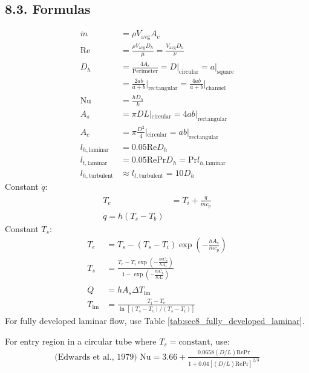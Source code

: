 \documentclass[10pt]{article}
\begin{document}
\begin{multicols*}{2}
\subsection*{8.3. Formulas}
\vspace{-0.4cm}
\begin{align*}
    \dot{m} &= \rho V_{\text{avg}} A_c \\
    \text{Re} &= \frac{\rho V_{\text{avg}} D_h}{\mu}  = \frac{V_{\text{avg}} D_h}{\nu} \\
    D_h &= \frac{4 A_c}{\text{Perimeter}} = D\rvert_{\text{circular}} = a\rvert_{\text{square}}   \\
    &= \frac{2ab}{a + b} \bigg\rvert_{\text{rectangular}} = \frac{4ab}{a+b}\bigg\rvert_{\text{channel}} \\
    \text{Nu} &= \frac{hD_h}{k} \\ 
    A_s &= \pi D L|_{\text{circular}} = 4ab|_{\text{rectangular}} \\
    A_c &= \pi \frac{D^2}{4}|_{\text{circular}} = ab|_{\text{rectangular}} \\
    l_{h, \text{laminar}} &= 0.05 \text{Re} D_h \\
    l_{t, \text{laminar}} &= 0.05 \text{Re} \text{Pr} D_h = \text{Pr} l_{h, \text{laminar}} \\
    l_{h, \text{turbulent}} &\approx l_{t, \text{turbulent}} = 10D_h 
\end{align*}
\vspace{-0.5cm}
Constant $\dot{q}$:
\begin{align*}
    T_e &= T_i + \frac{\dot{q}}{\dot{m} c_p} \\ 
    \dot{q} = h(T_s-T_b)
\end{align*}
Constant $T_s$:
\vspace{-0.5cm}
\begin{align*}
    T_e &= T_s - (T_s - T_i) \exp\left(-\frac{h A_s}{\dot{m} c_p}\right) \\
    T_s &=\frac{T_e - T_i \exp\left(-\frac{\dot{m} C_p}{h A_s}\right)}{1 - \exp\left(-\frac{\dot{m} C_p}{h A_s}\right)} \\
    \dot{Q} &= h A_s \Delta T_{\text{lm}} \\
    T_{\text{lm}} &= \frac{T_{i} - T_{e}}{\ln[(T_{s} - T_{e})/(T_{s} - T_{i})]} 
\end{align*}    
For fully developed laminar flow, use Table \ref{tab:sec8_fully_developed_laminar}.

For entry region in a circular tube where $T_s = \text{constant}$, use:
\vspace{-0.5cm}
\begin{align*}
    \text{(Edwards et al., 1979) } \text{Nu} = 3.66 + \frac{0.0658(D/L) \text{Re} \text{Pr}}{1 + 0.04[(D/L) \text{Re} \text{Pr}]^{2/3}} 
\end{align*}


\end{multicols*}
\end{document}

